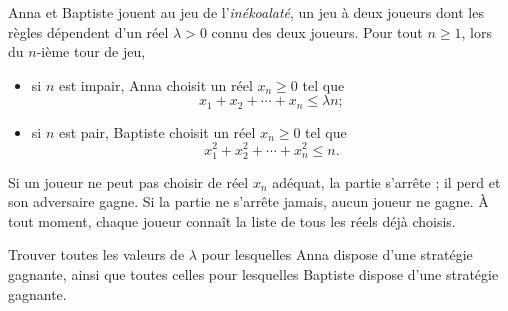 Anna et Baptiste jouent au jeu de l'\emph{inékoalaté}, un jeu à deux
joueurs dont les règles dépendent d'un réel $\lambda > 0$ connu des
deux joueurs. Pour tout $n \geqslant 1$, lors du $n$-ième tour
de jeu,
\begin{itemize}
  \item si $n$ est impair, Anna choisit un réel $x_n \geqslant 0$ tel
  que
  \[
  x_1 + x_2 + \cdots + x_n \leqslant \lambda n ;
  \]
  \item si $n$ est pair, Baptiste choisit un réel $x_n \geqslant 0$
  tel que
  \[
  x_1^2 + x_2^2 + \cdots + x_n^2 \leqslant n.
  \]
\end{itemize}
Si un joueur ne peut pas choisir de réel $x_n$ adéquat, la partie
s'arrête ; il perd et son adversaire gagne. Si la partie ne s'arrête
jamais, aucun joueur ne gagne. À tout moment, chaque joueur connaît la
liste de tous les réels déjà choisis.

Trouver toutes les valeurs de $\lambda$ pour lesquelles Anna dispose
d'une stratégie gagnante, ainsi que toutes celles pour lesquelles
Baptiste dispose d'une stratégie gagnante.
